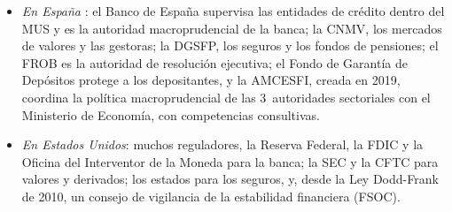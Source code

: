 \documentclass[11pt]{article}
\begin{document}
\begin{itemize}
\begin{itemize}
\begin{itemize}
    \item el \emph{Mecanismo Único de Resolución} (MUR): la Junta Única de Resolución decide la resolución de los bancos significativos y transfronterizos, con un Fondo Único de Resolución de más de 81.000~millones de euros a finales de 2025, financiado por los bancos\nocite{RegUE2014MUR,SRB2026FUR};
    \item el \emph{Sistema Europeo de Garantía de Depósitos} (EDIS), propuesto en 2015, nunca se aprobó, y en noviembre de 2026 la Comisión anunció su retirada para presentar nuevas propuestas: la garantía sigue en fondos nacionales\nocite{CE2015EDIS,PE2026EDIS};
    \item todo ello sobre un : el reglamento y la directiva de requisitos de capital (CRR y CRD), la directiva de reestructuración y resolución (BRRD) y la de garantía de depósitos (DGSD).
    \end{itemize}
  \end{itemize}
\item \emph{En España} : el Banco de España supervisa las entidades de crédito dentro del MUS y es la autoridad macroprudencial de la banca; la CNMV, los mercados de valores y las gestoras; la DGSFP, los seguros y los fondos de pensiones; el FROB es la autoridad de resolución ejecutiva; el Fondo de Garantía de Depósitos protege a los depositantes, y la AMCESFI, creada en 2019, coordina la política macroprudencial de las 3~autoridades sectoriales con el Ministerio de Economía, con competencias consultivas\nocite{BOE2019AMCESFI}.
\item \emph{En Estados Unidos}: muchos reguladores, la Reserva Federal, la FDIC y la Oficina del Interventor de la Moneda para la banca; la SEC y la CFTC para valores y derivados; los estados para los seguros, y, desde la Ley Dodd-Frank de 2010, un consejo de vigilancia de la estabilidad financiera (FSOC).
\end{itemize}
\end{document}
